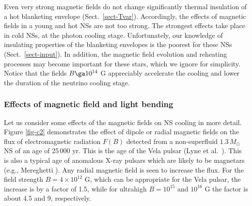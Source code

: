 \documentclass{aa}
\begin{document}
Even very strong magnetic fields do not change
significantly thermal insulation of a hot
blanketing envelope (Sect.\ \ref{sect-Tvar}).
Accordingly, the effects
of magnetic fields in a young and hot NSs
are not too strong. The strongest effects
take place in cold NSs, at the photon cooling
stage. Unfortunately, our knowledge of insulating
properties of the blanketing envelopes is the
poorest for these NSs (Sect.\ \ref{sect-input}).
In addition, the magnetic field evolution 
and reheating processes
may become
important for these stars, which we ignore for simplicity.
Notice that the fields $B \ga 10^{14}$ G
appreciably accelerate the cooling and lower
the duration of the neutrino cooling stage.

\subsubsection{Effects of magnetic field and light bending}
%
Let us consider some effects of the magnetic fields on NS
cooling in more detail. Figure \ref{fig-c2}
demonstrates the effect of dipole or radial
magnetic fields on the flux of electromagnetic radiation
$F(B)$ detected from a non-superfluid $1.3 \, M_\odot$ NS
of an age of 25\,000 yr. This is the age of the Vela pulsar
(Lyne et al.\ \cite{lyneetal96}).
This is also a typical age of anomalous X-ray pulsars
which are likely
to be magnetars (e.g., Mereghetti \cite{mereghetti01}).
Any radial magnetic field is seen to increase the flux.
For the field strength $B = 4 \times 10^{12}$ G,
which can be appropriate for
the Vela pulsar, the increase is by a factor of 1.5,
while for ultrahigh $B =10^{15}$ and
$10^{16}$ G
the factor is about 4.5 and 9, respectively.
\end{document}
